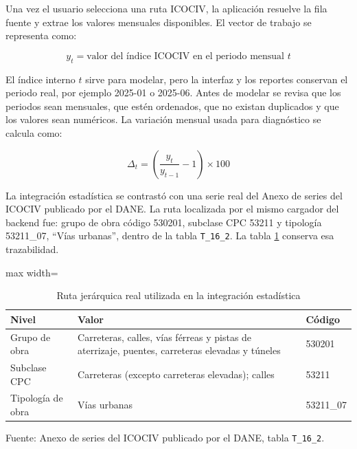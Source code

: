 \documentclass[12pt,letterpaper]{article}
\newcommand{\ICOCIV}{ICOCIV}
\newcommand{\DANE}{DANE}
\begin{document}
Una vez el usuario selecciona una ruta \ICOCIV{}, la aplicación resuelve la fila fuente y extrae los valores mensuales disponibles. El vector de trabajo se representa como:

\begin{equation}
y_t = \text{valor del índice ICOCIV en el periodo mensual } t
\end{equation}

El índice interno \(t\) sirve para modelar, pero la interfaz y los reportes conservan el periodo real, por ejemplo 2025-01 o 2025-06. Antes de modelar se revisa que los periodos sean mensuales, que estén ordenados, que no existan duplicados y que los valores sean numéricos. La variación mensual usada para diagnóstico se calcula como:

\begin{equation}
\Delta_t = \left(\frac{y_t}{y_{t-1}} - 1\right) \times 100
\end{equation}

La integración estadística se contrastó con una serie real del Anexo de series del \ICOCIV{} publicado por el \DANE. La ruta localizada por el mismo cargador del backend fue: grupo de obra código 530201, subclase CPC 53211 y tipología 53211\_07, ``Vías urbanas'', dentro de la tabla \texttt{T\_16\_2}. La tabla \ref{tab:ruta_real_icociv} conserva esa trazabilidad.

\begin{table}[H]
\centering
\caption{Ruta jerárquica real utilizada en la integración estadística}
\label{tab:ruta_real_icociv}
\vspace{\baselineskip}
\scriptsize
\begin{adjustbox}{max width=\textwidth}
\begin{tabular}{p{3.2cm}p{10.3cm}p{2.2cm}}
\toprule
\textbf{Nivel} & \textbf{Valor} & \textbf{Código} \\
\midrule
Grupo de obra & Carreteras, calles, vías férreas y pistas de aterrizaje, puentes, carreteras elevadas y túneles & 530201 \\
Subclase CPC & Carreteras (excepto carreteras elevadas); calles & 53211 \\
Tipología de obra & Vías urbanas & 53211\_07 \\
\bottomrule
\end{tabular}
\end{adjustbox}
\par\footnotesize Fuente: Anexo de series del \ICOCIV{} publicado por el \DANE, tabla \texttt{T\_16\_2}.
\end{table}
\end{document}
